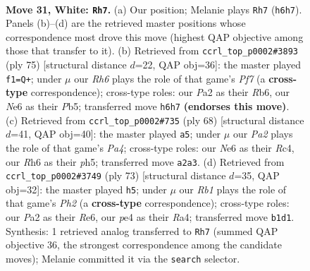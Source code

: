 \documentclass[11pt]{article}
\begin{document}
\clearpage

\begin{figure}[p]\centering
\begin{subfigure}{0.46\textwidth}\centering
\resizebox{\linewidth}{!}{%
\newchessgame
\chessboard[
  setfen={8/pp6/4N2R/1kp2p2/4p3/8/PPr2r1P/1R2K3 w - - 0 31},
  showmover=false,
  pgfstyle=straightmove, color=movearrow, markmove={h6-h7}
]}
\caption{}
\end{subfigure}\hfill
\begin{subfigure}{0.46\textwidth}\centering
\resizebox{\linewidth}{!}{%
\newchessgame
\chessboard[
  setfen={3r1k2/6RR/1r4p1/1p6/8/PP6/2Pn1pBP/2K5 b - - 3 38},
  showmover=false,
  pgfstyle=straightmove, color=movearrow, markmove={f2-f1}
]}
\caption{}
\end{subfigure}
\\[4pt]
\begin{subfigure}{0.46\textwidth}\centering
\resizebox{\linewidth}{!}{%
\newchessgame
\chessboard[
  setfen={6k1/2p2pp1/8/7p/PPR5/4K2P/1P1r2r1/R7 w - - 5 35},
  showmover=false,
  pgfstyle=straightmove, color=movearrow, markmove={a4-a5}
]}
\caption{}
\end{subfigure}\hfill
\begin{subfigure}{0.46\textwidth}\centering
\resizebox{\linewidth}{!}{%
\newchessgame
\chessboard[
  setfen={8/7p/2p1r1k1/4pR2/r3n3/P6P/1P4P1/2K1BR2 b - - 2 37},
  showmover=false,
  pgfstyle=straightmove, color=movearrow, markmove={h7-h5}
]}
\caption{}
\end{subfigure}
\caption{\textbf{Move 31, White: \texttt{Rh7}.} (a) Our position; Melanie plays \texttt{Rh7} (\texttt{h6h7}). Panels (b)--(d) are the retrieved master positions whose correspondence most drove this move (highest QAP objective among those that transfer to it). (b) Retrieved from \texttt{ccrl\_top\_p0002\#3893} (ply 75) [structural distance $d$=22, QAP obj=36]: the master played \texttt{f1=Q+}; under $\mu$ our \emph{Rh6} plays the role of that game's \emph{Pf7} (a \textbf{cross-type} correspondence); cross-type roles: our \emph{P}a2 as their \emph{R}b6, our \emph{N}e6 as their \emph{P}b5; transferred move \texttt{h6h7} \textbf{(endorses this move)}. (c) Retrieved from \texttt{ccrl\_top\_p0002\#735} (ply 68) [structural distance $d$=41, QAP obj=40]: the master played \texttt{a5}; under $\mu$ our \emph{Pa2} plays the role of that game's \emph{Pa4}; cross-type roles: our \emph{N}e6 as their \emph{R}c4, our \emph{R}h6 as their \emph{p}h5; transferred move \texttt{a2a3}. (d) Retrieved from \texttt{ccrl\_top\_p0002\#3749} (ply 73) [structural distance $d$=35, QAP obj=32]: the master played \texttt{h5}; under $\mu$ our \emph{Rb1} plays the role of that game's \emph{Ph2} (a \textbf{cross-type} correspondence); cross-type roles: our \emph{P}a2 as their \emph{R}e6, our \emph{p}e4 as their \emph{R}a4; transferred move \texttt{b1d1}. Synthesis: 1 retrieved analog transferred to \texttt{Rh7} (summed QAP objective 36, the strongest correspondence among the candidate moves); Melanie committed it via the \texttt{search} selector.}
\label{fig:thought-m60}
\end{figure}
\end{document}
